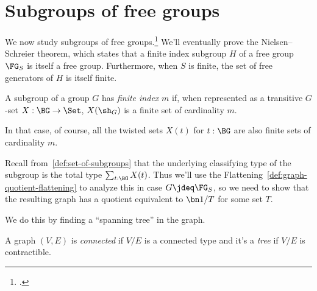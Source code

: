 \section{Subgroups of free groups}
\label{sec:subgroups-free}

We now study subgroups of free groups.\footcitetext{Swan2022}
We'll eventually prove the Nielsen--Schreier theorem,
which states that a finite index subgroup $H$ of a free group $\FG_S$ is itself a free group.
Furthermore, when $S$ is finite, the set of free generators of $H$ is itself finite.

\begin{definition}\label{def:finite-index}
  A subgroup of a group $G$ has \emph{finite index} $m$ if, when represented as a
  transitive $G$-set $X : \BG \to \Set$, $X(\sh_G)$ is a finite set of cardinality $m$.
\end{definition}
In that case, of course, all the twisted sets $X(t)$ for $t:\BG$ are also finite sets
of cardinality $m$.

Recall from~\cref{def:set-of-subgroups} that the underlying classifying type of the subgroup is the total type $\sum_{t:\BG}X(t)$.
Thus we'll use the Flattening~\cref{def:graph-quotient-flattening} to analyze
this in case $G \jdeq \FG_S$, so we need to show that the resulting graph
has a quotient equivalent to $\bn 1/T$ for some set $T$.

We do this by finding a ``spanning tree'' in the graph.

\begin{definition}
  A graph $(V,E)$ is \emph{connected} if $V/E$ is a connected type
  and it's a \emph{tree} if $V/E$ is contractible.
\end{definition}

